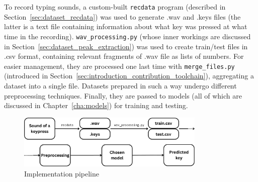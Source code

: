 \documentclass[../main.tex]{subfiles}
\begin{document}
To record typing sounds, a custom-built \texttt{recdata} program  (described in Section~\ref{sec:dataset_recdata}) was used to generate  .wav and .keys files (the latter is a text file containing information about what key was pressed at what time in the recording). \texttt{wav\_processing.py} (whose inner workings are discussed in Section~\ref{sec:dataset_peak_extraction}) was used to create train/test files in .csv format, containing relevant fragments of .wav file as lists of numbers. For easier management, they are processed one last time with \texttt{merge\_files.py} (introduced in Section~\ref{sec:introduction_contribution_toolchain}), aggregating a dataset into a single file.
Datasets prepared in such a way undergo different preprocessing techniques. Finally, they are passed to models (all of which are discussed in Chapter~\ref{cha:models}) for training and testing.

\begin{figure}[ht]
    \centering
    \includegraphics[width=0.8\textwidth]{figures/pipeline.pdf}
    \caption{Implementation pipeline}
    \label{fig:pipeline}
\end{figure}%

\end{document}
